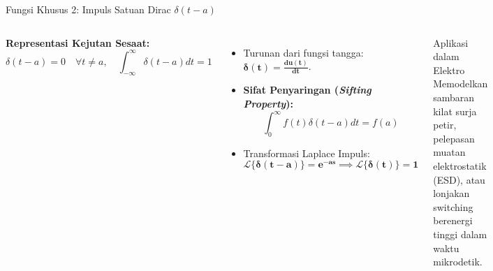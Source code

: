 \documentclass[aspectratio=169,10pt]{beamer}
\begin{document}
\begin{frame}{Fungsi Khusus 2: Impuls Satuan Dirac $\delta(t - a)$}
  \begin{columns}[c]
    \textbf{Representasi Kejutan Sesaat:}
    \begin{equation}
      \delta(t - a) = 0 \quad \forall t \neq a, \quad \int_{-\infty}^\infty \delta(t - a) dt = 1
    \end{equation}
    \begin{itemize}
      \item Turunan dari fungsi tangga: $\mathbf{\delta(t) = \frac{du(t)}{dt}}$.
      \item \textbf{Sifat Penyaringan (\textit{Sifting Property}):}
      \begin{equation*}
        \int_0^\infty f(t) \delta(t - a) dt = f(a)
      \end{equation*}
      \item Transformasi Laplace Impuls:
      \begin{equation*}
        \mathbf{\mathcal{L}\{\delta(t - a)\} = e^{-as} \implies \mathcal{L}\{\delta(t)\} = 1}
      \end{equation*}
    \end{itemize}

    \begin{alertblock}{Aplikasi dalam Elektro}
      Memodelkan sambaran kilat surja petir, pelepasan muatan elektrostatik (ESD), atau lonjakan switching berenergi tinggi dalam waktu mikrodetik.
    \end{alertblock}
  \end{columns}
\end{frame}
\end{document}
